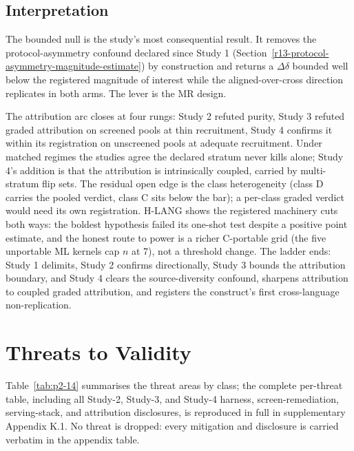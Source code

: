 \documentclass[manuscript,screen,review]{acmart}
\begin{document}
\subsection{Interpretation}\label{study4-interpretation}

The bounded null is the study's most consequential result. It removes the
protocol-asymmetry confound declared since Study 1
(Section~\ref{r13-protocol-asymmetry-magnitude-estimate}) by construction and
returns a \(\Delta\delta\) bounded well below the registered magnitude of
interest while the aligned-over-cross direction replicates in both arms. The
lever is the MR design.

The attribution arc closes at four rungs: Study 2 refuted purity, Study 3
refuted graded attribution on screened pools at thin recruitment, Study 4
confirms it within its registration on unscreened pools at adequate
recruitment. Under matched regimes the studies agree the declared stratum
never kills alone; Study 4's addition is that the attribution is
intrinsically coupled, carried by multi-stratum flip sets. The residual open
edge is the class heterogeneity (class D carries the pooled verdict, class C
sits below the bar); a per-class graded verdict would need its own
registration. H-LANG shows the registered machinery cuts both ways: the
boldest hypothesis failed its one-shot test despite a positive point
estimate, and the honest route to power is a richer C-portable grid (the
five unportable ML kernels cap \(n\) at 7), not a threshold change. The
ladder ends: Study 1
delimits, Study 2 confirms directionally, Study 3 bounds the attribution
boundary, and Study 4 clears the source-diversity confound, sharpens
attribution to coupled graded attribution, and registers the construct's
first cross-language non-replication.

\section{Threats to Validity}\label{threats-to-validity}

Table~\ref{tab:p2-14} summarises the threat areas by class; the complete
per-threat table, including all Study-2, Study-3, and Study-4 harness,
screen-remediation, serving-stack, and attribution disclosures, is reproduced in full in
supplementary Appendix K.1. No threat is dropped: every mitigation and
disclosure is carried verbatim in the appendix table.
\end{document}
